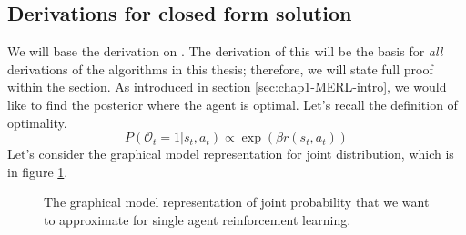 \subsection{Derivations for closed form solution}
\label{sec:chap2-derivation-soft-closed-form}

We will base the derivation on \cite{levine2018reinforcement}. The derivation of this will be the basis for \textit{all} derivations of the algorithms in this thesis; therefore, we will state full proof within the section. As introduced in section \ref{sec:chap1-MERL-intro}, we would like to find the posterior where the agent is optimal. Let's recall the definition of optimality. 
\begin{equation}
    P(\mathcal{O}_t = 1 | s_t, a_t) \propto \exp (\beta r (s_t, a_t))
\end{equation}
Let's consider the graphical model representation for joint distribution, which is in figure \ref{fig:chap2-single-graphical-optim}. 
\begin{figure}[ht]
    \begin{minipage}[t]{0.5\linewidth}
    \centering
    \end{minipage}%
    \begin{minipage}[t]{0.5\linewidth}
    \caption{The graphical model representation of joint probability that we want to approximate for single agent reinforcement learning.}
    \label{fig:chap2-single-graphical-optim}
    \end{minipage}
\end{figure}
